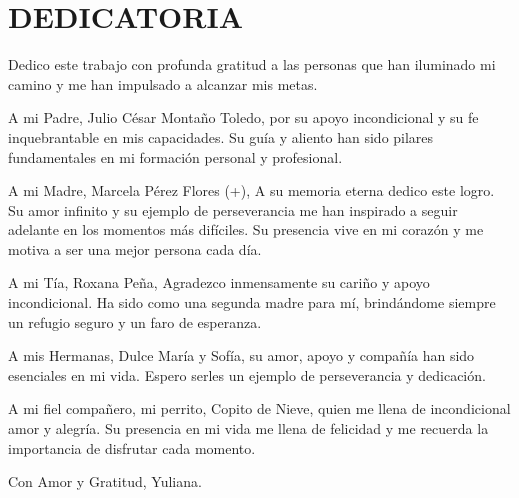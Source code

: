 \thispagestyle{plain}
\clearpage
{} 
\setcounter{page}{1}
\thispagestyle{plain}
\section*{\centering DEDICATORIA}
\justify %

\indent Dedico este trabajo con profunda gratitud a las personas que han iluminado mi camino y me han impulsado a alcanzar mis metas. \newline

A mi Padre, Julio César Montaño Toledo, por su apoyo incondicional y su fe inquebrantable en mis capacidades. Su guía y aliento han sido pilares fundamentales en mi formación personal y profesional. \newline

A mi Madre, Marcela Pérez Flores (+), A su memoria eterna dedico este logro. Su amor infinito y su ejemplo de perseverancia me han inspirado a seguir adelante en los momentos más difíciles. Su presencia vive en mi corazón y me motiva a ser una mejor persona cada día. \newline

A mi Tía, Roxana Peña, Agradezco inmensamente su cariño y apoyo incondicional. Ha sido como una segunda madre para mí, brindándome siempre un refugio seguro y un faro de esperanza. \newline

A mis Hermanas, Dulce María y Sofía, su amor, apoyo y compañía han sido esenciales en mi vida. Espero serles un ejemplo de perseverancia y dedicación. \newline

A mi fiel compañero, mi perrito, Copito de Nieve, quien me llena de incondicional amor y alegría. Su presencia en mi vida me llena de felicidad y me recuerda la importancia de disfrutar cada momento. \newline

Con Amor y Gratitud, \newline
\indent Yuliana.